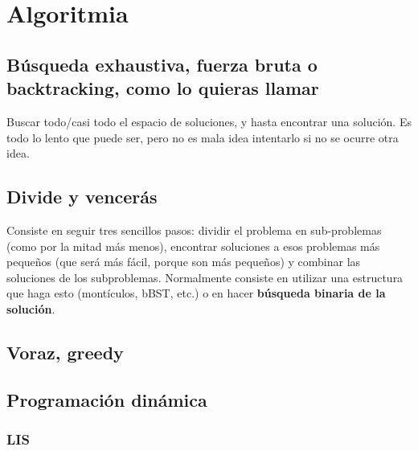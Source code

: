 \chapter{Algoritmia}

\section{Búsqueda exhaustiva, fuerza bruta o backtracking, como lo quieras llamar}
Buscar todo/casi todo el espacio de soluciones, y hasta encontrar una solución. Es todo lo lento
que puede ser, pero no es mala idea intentarlo si no se ocurre otra idea.

\section{Divide y vencerás}
Consiste en seguir tres sencillos pasos: dividir el problema en sub-problemas
(como por la mitad más menos), encontrar soluciones a esos problemas más
pequeños (que será más fácil, porque son más pequeños) y combinar las soluciones
de los subproblemas. Normalmente consiste en utilizar una estructura que haga esto
(montículos, bBST, etc.) o en hacer \textbf{búsqueda binaria de la solución}.


\section{Voraz, greedy}

\section{Programación dinámica}
\subsection{LIS}
